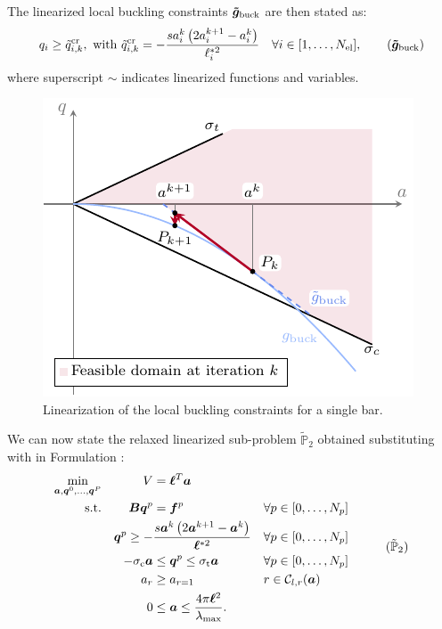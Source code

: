 The linearized local buckling constraints $\bm{\tilde{g}}_{\textrm{buck}}$ are then stated as:
\begin{equation}
    q_{i} \geq \tilde{q}^{\text{cr}}_{i,k},\text{ with } \tilde{q}^{\text{cr}}_{i,k}= - \frac{s a_{i}^k\left(2 a_{i}^{k+1} - a_{i}^k\right)}{\ell^{*2}_i} \quad \forall i \in [1,\ldots, N_{\text{el}}],
    \label{eq:04_buck_con_lin}
    \tag{$\vect{\tilde{g}}_{\textrm{buck}}$}
\end{equation}
where superscript $\sim$ indicates linearized functions and variables.

\begin{figure}
    \centering
    \includegraphics[width=0.7\linewidth]{figures/04_TTO_improvements/03_SLP/slp.pdf}
    \caption{Linearization of the local buckling constraints for a single bar.}
    \label{fig:04_SLP}
\end{figure}


We can now state the relaxed linearized sub-problem $\tilde{\mathbb{P}}_2$ obtained substituting  with  in Formulation :
\begin{equation}
    \begin{aligned}
    \min_{\vect{a}, \vect{q}^0, \dots, \vect{q}^P}   && V &= \vect{\ell}^{T}\vect{a}\\
    \textrm{s.t.}   && \matr{B}\vect{q}^p &= \vect{f}^p && \forall p \in [0,\dots,N_p]\\
    && \vect{q}^p \geq - &\frac{s \vect{a}^k\left(2 \vect{a}^{k+1} - \vect{a}^k\right)}{\vect{\ell}^{*2}} && \forall p \in [0,\dots,N_p] \\
    && -\sigma_\text{c}\vect{a} &\leq \vect{q}^p \leq \sigma_\text{t}\vect{a} && \forall p \in [0,\dots,N_p] \\
    && a_{r}&\geq a_{r=1} && r \in \mathcal{C}_{l,r}(\vect{a}) \\
    && 0 &\leq \vect{a} \leq \frac{4 \pi \vect{\ell}^2}{\lambda_{\text{max}}}. \\
    \end{aligned}
    \tag{$\tilde{\mathbb{P}}_2$}
    \label{eq:04_optim_no_constr_lp}
\end{equation}

